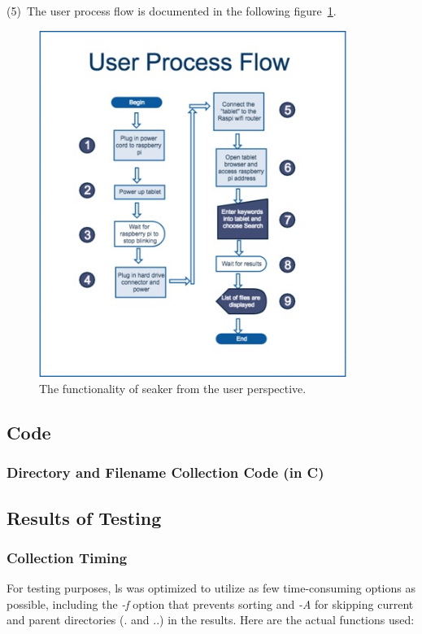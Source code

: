 \documentclass[12pt]{article}
\begin{document}
(5)~The user process flow is documented in the following
figure~\ref{fig:user_process_flow}.

\begin{figure}[ht]
  \begin{center}
  \includegraphics[width=10cm]{images/user_process_flow.jpg}
  \caption{The functionality of \gls{seaker} from the user perspective.}
  \label{fig:user_process_flow}
  \end{center}
\end{figure}

\newpage
\subsection{Code}
\subsubsection{Directory and Filename Collection Code (in C)}


\newpage
\subsection{Results of Testing}
\subsubsection{Collection Timing}

For testing purposes, ls was optimized to utilize as few time-consuming
options as possible, including the {\em -f} option that prevents sorting
and {\em -A} for skipping current and parent directories (. and ..)
in the results.
Here are the actual functions used:
\end{document}
